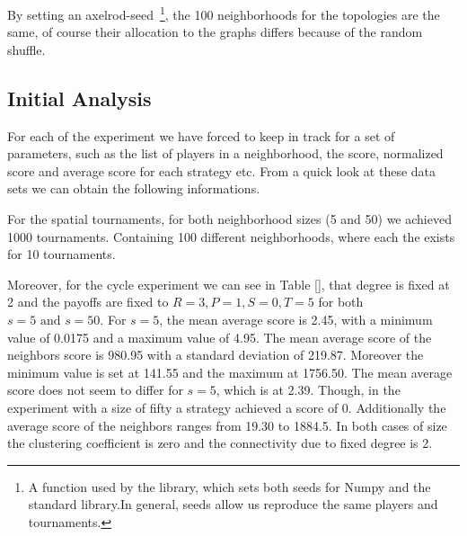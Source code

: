 By setting an axelrod-seed~\footnote{A function used by the library, which sets
both seeds for Numpy and the standard library.In general, seeds allow us
reproduce the same players and tournaments.}, the 100 neighborhoods for the
topologies are the same, of course their allocation to the graphs differs because
of the random shuffle.

\subsection{Initial Analysis}

For each of the experiment we have forced to keep in track for a set of parameters,
such as the list of players in a neighborhood, the score, normalized score and
average score for each strategy etc. From a quick look at these data sets
we can obtain the following informations.

For the spatial tournaments, for both neighborhood sizes (5 and 50)
we achieved 1000 tournaments. Containing 100 different neighborhoods, where each
the exists for 10 tournaments.

Moreover, for the cycle experiment we can see in Table [], that degree is
fixed at 2 and the payoffs are fixed to \(R=3, P=1, S=0, T=5\) for both
\( s=5\textrm{ and } s=50 \). For \(s=5\), the mean average score
is 2.45, with a minimum value of 0.0175 and a maximum value of 4.95. The
mean average score of the neighbors score is 980.95 with a standard deviation
of 219.87. Moreover the minimum value is set at 141.55 and the maximum at
1756.50. The mean average score does not seem to differ for \(s=5\),
which is at 2.39. Though, in the experiment with a size of fifty a strategy
achieved a score of 0. Additionally the average score of the neighbors ranges
from 19.30 to 1884.5. In both cases of size the clustering coefficient is zero
and the connectivity due to fixed degree is 2.

